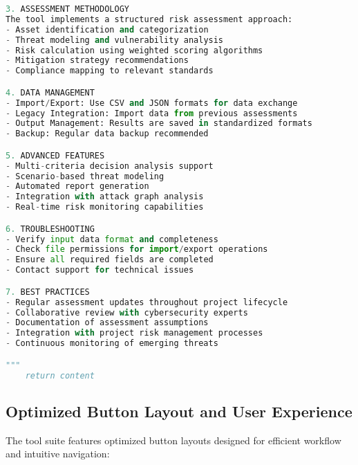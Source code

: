 \documentclass[binding=0.6cm]{sapthesis}
\begin{document}
\begin{lstlisting}[language=Python, caption=Enhanced Help System Implementation]
3. ASSESSMENT METHODOLOGY
The tool implements a structured risk assessment approach:
- Asset identification and categorization
- Threat modeling and vulnerability analysis
- Risk calculation using weighted scoring algorithms
- Mitigation strategy recommendations
- Compliance mapping to relevant standards

4. DATA MANAGEMENT
- Import/Export: Use CSV and JSON formats for data exchange
- Legacy Integration: Import data from previous assessments
- Output Management: Results are saved in standardized formats
- Backup: Regular data backup recommended

5. ADVANCED FEATURES
- Multi-criteria decision analysis support
- Scenario-based threat modeling
- Automated report generation
- Integration with attack graph analysis
- Real-time risk monitoring capabilities

6. TROUBLESHOOTING
- Verify input data format and completeness
- Check file permissions for import/export operations
- Ensure all required fields are completed
- Contact support for technical issues

7. BEST PRACTICES
- Regular assessment updates throughout project lifecycle
- Collaborative review with cybersecurity experts
- Documentation of assessment assumptions
- Integration with project risk management processes
- Continuous monitoring of emerging threats

"""
    return content
\end{lstlisting}

\subsection{Optimized Button Layout and User Experience}

The tool suite features optimized button layouts designed for efficient workflow and intuitive navigation:
\end{document}
